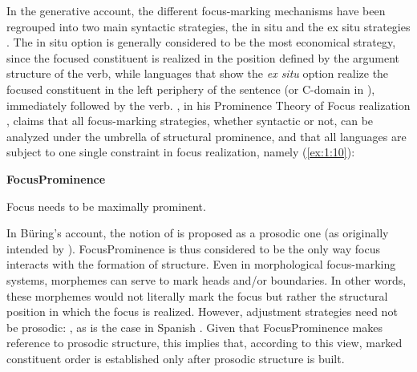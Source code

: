  In the generative account, the different focus-marking mechanisms have been regrouped into two main syntactic strategies, the in situ and the ex situ strategies \parencite{aboh2008focus}. The in situ option is generally considered to be the most economical strategy, since the focused constituent is realized in the position defined by the argument structure of the verb, while languages that show the \textit{ex situ} option realize the focused constituent in the left periphery of the sentence (or C-domain in \cite{rizzi1997fine}), immediately followed by the verb. 
\textcite{buring2009towards}, in his Prominence Theory of Focus realization
\parencite{truckenbrodt1995phonological, buring2009towards}, claims that all focus-marking strategies, whether syntactic or not, can be analyzed under the umbrella of structural prominence, and that all languages are subject to one single constraint in focus realization, namely (\ref{ex:1:10}):

\ea \textbf{FocusProminence}\\ \label{ex:1:10}

Focus needs to be maximally prominent.
\z


 In Büring's account, the notion of  is proposed as a prosodic one (as originally intended by \cite{truckenbrodt1995phonological}). FocusProminence is thus considered to be the only way focus interacts with the formation of structure. Even in morphological focus-marking systems, morphemes can serve to mark heads and/or boundaries. In other words, these morphemes would not literally mark the focus but rather the structural position in which the focus is realized.
However, adjustment strategies need not be prosodic:  \parencite[7]{buring2009towards}, as is the case in Spanish \parencite{zubizarreta1998prosody}. Given that FocusProminence makes reference to prosodic structure, this implies that, according to this view, marked constituent order is established only after prosodic structure is built.

